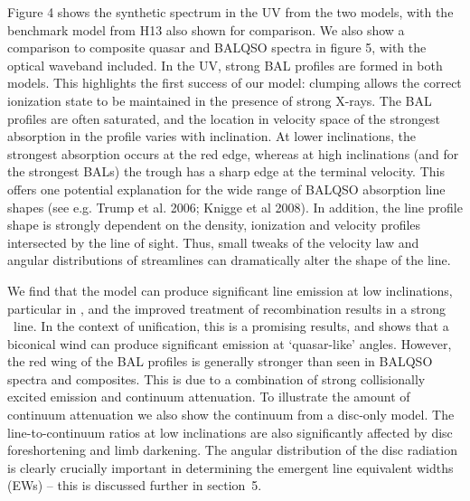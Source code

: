 \documentclass[useAMS,usenatbib]{mn2e_x}
\begin{document}
Figure 4 shows the synthetic spectrum in the UV from the two models, with the
benchmark model from H13 also shown for comparison. We also show a comparison
to composite quasar and BALQSO spectra in figure 5, with the optical waveband 
included. In the UV, strong BAL profiles are formed in both models. This
highlights the first success of our model: clumping allows the correct ionization state 
to be maintained in the presence of strong X-rays. 
The BAL profiles are often saturated, and the location in velocity space
of the strongest absorption in the profile varies with inclination.
At lower inclinations, the strongest absorption occurs at the red edge,
whereas at high inclinations (and for the strongest BALs)
the trough has a sharp edge at the terminal velocity.
This offers one potential explanation for the wide range of BALQSO absorption
line shapes (see e.g. Trump et al. 2006; Knigge et al 2008).
In addition, the line profile shape is strongly dependent 
on the density, ionization and velocity 
profiles intersected by the line of sight. Thus, small tweaks of the velocity
law and angular distributions of streamlines can dramatically alter
the shape of the line.

We find that the model can produce significant line emission
at low inclinations, particular in \civ, 
and the improved treatment of recombination results in a strong \la\
line. In the context of unification, this is a promising results, 
and shows that a biconical wind can produce significant 
emission at `quasar-like' angles.
However, the red wing of the BAL profiles 
is generally stronger than seen in BALQSO spectra and composites.
This is due to a combination of strong collisionally excited emission
and continuum attenuation. To illustrate the amount of 
continuum attenuation we also show the continuum from a disc-only model.
The line-to-continuum ratios at low inclinations are also
significantly affected by disc foreshortening and limb darkening.
The angular distribution of the disc radiation is clearly
crucially important in determining the emergent line equivalent widths 
(EWs) -- this is discussed further in section~5.
\end{document}
